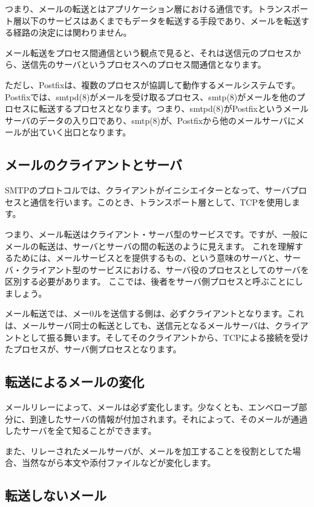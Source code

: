 つまり、メールの転送とはアプリケーション層における通信です。トランスポート層以下のサービスはあくまでもデータを転送する手段であり、メールを転送する経路の決定には関わりません。

メール転送をプロセス間通信という観点で見ると、それは送信元のプロセスから、送信先のサーバというプロセスへのプロセス間通信となります。

ただし、Postfixは、複数のプロセスが協調して動作するメールシステムです。Postfixでは、smtpd(8)がメールを受け取るプロセス、smtp(8)がメールを他のプロセスに転送するプロセスとなります。つまり、smtpd(8)がPostfixというメールサーバのデータの入り口であり、smtp(8)が、Postfixから他のメールサーバにメールが出ていく出口となります。

\subsection{メールのクライアントとサーバ}

SMTPのプロトコルでは、クライアントがイニシエイターとなって、サーバプロセスと通信を行います。このとき、トランスポート層として、TCPを使用します。

つまり、メール転送はクライアント・サーバ型のサービスです。ですが、一般にメールの転送は、サーバとサーバの間の転送のように見えます。
これを理解するためには、メールサービスとを提供するもの、という意味のサーバと、サーバ・クライアント型のサービスにおける、サーバ役のプロセスとしてのサーバを区別する必要があります。
ここでは、後者をサーバ側プロセスと呼ぶことにしましょう。

メール転送では、メー0ルを送信する側は、必ずクライアントとなります。これは、メールサーバ同士の転送としても、送信元となるメールサーバは、クライアントとして振る舞います。そしてそのクライアントから、TCPによる接続を受けたプロセスが、サーバ側プロセスとなります。


\subsection{転送によるメールの変化}

メールリレーによって、メールは必ず変化します。少なくとも、エンベローブ部分に、到達したサーバの情報が付加されます。それによって、そのメールが通過したサーバを全て知ることができます。

また、リレーされたメールサーバが、メールを加工することを役割としてた場合、当然ながら本文や添付ファイルなどが変化します。

\subsection{転送しないメール}


